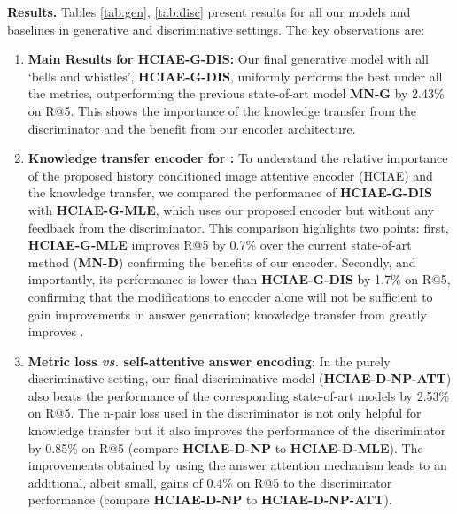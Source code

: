 \documentclass{article}
\newcommand{\ourenc}{HCIAE\xspace}
\begin{document}
\textbf{Results.} 
Tables \ref{tab:gen}, \ref{tab:disc} present results for all our models and baselines in generative and discriminative settings. 
The key observations are: 
\begin{enumerate}
\item {\bf Main Results for \ourenc-G-DIS:} Our final generative model with all `bells and whistles', \textbf{\ourenc-G-DIS}, 
uniformly performs the best under all the metrics, outperforming the previous state-of-art model \textbf{MN-G} by 2.43\% on R@5. 
This shows the importance of the knowledge transfer from the discriminator and the benefit from our encoder architecture. 

\item {\bf Knowledge transfer \vs encoder for :} To understand the relative importance of the proposed history 
conditioned image attentive encoder (\ourenc) and the knowledge transfer, we compared the performance of \textbf{\ourenc-G-DIS} 
with \textbf{\ourenc-G-MLE}, 
which uses our proposed encoder but without any feedback from the discriminator. 
This comparison highlights two points: first, \textbf{\ourenc-G-MLE} improves R@5 by 0.7\% over the current 
state-of-art method (\textbf{MN-D}) confirming the benefits of our encoder. Secondly, and importantly,  its performance 
is lower than \textbf{\ourenc-G-DIS} by 1.7\% on R@5, confirming that the modifications to encoder alone will not be sufficient to gain 
improvements in answer generation; knowledge transfer from  greatly improves . 

\item {\bf Metric loss {\it vs.} self-attentive answer encoding}: In the purely discriminative setting, our final discriminative 
model (\textbf{\ourenc-D-NP-ATT}) also beats the performance of the corresponding state-of-art models \cite{visdial} by 2.53\% on R@5. 
The n-pair loss used in the discriminator is not only helpful for knowledge transfer but it also improves the performance 
of the discriminator by 0.85\% on R@5 (compare \textbf{\ourenc-D-NP} to 
\textbf{\ourenc-D-MLE}).
The improvements obtained by using the 
answer attention mechanism leads to an additional, albeit small,
gains of 0.4\%  on R@5 to the discriminator performance (compare \textbf{\ourenc-D-NP} to \textbf{\ourenc-D-NP-ATT}). 
\end{enumerate}
\end{document}
